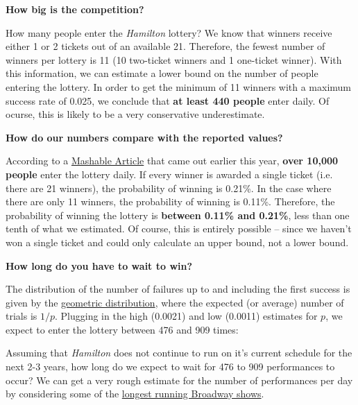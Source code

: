 \documentclass[12pt]{article}
\begin{document}
\vspace{5mm}

\textbf{How big is the competition?}

How many people enter the \textit{Hamilton} lottery? We know that winners receive either 1 or 2 tickets out of an available 21. Therefore, the fewest number of winners per lottery is 11 (10 two-ticket winners and 1 one-ticket winner). With this information, we can estimate a lower bound on the number of people entering the lottery. In order to get the minimum of 11 winners with a maximum success rate of 0.025, we conclude that \textbf{at least 440 people} enter daily.  Of ocurse, this is likely to be a very conservative underestimate.

\vspace{5mm}

\textbf{How do our numbers compare with the reported values?}

According to a \href{http://mashable.com/2016/05/26/odds-of-winning-a-hamilton-ticket/#v7nFUSKb6iqZ}{Mashable Article} that came out earlier this year, \textbf{over 10,000 people} enter the lottery daily. If every winner is awarded a single ticket (i.e. there are 21 winners), the probability of winning is 0.21\%. In the case where there are only 11 winners, the probability of winning is 0.11\%. Therefore, the probability of winning the lottery is \textbf{between 0.11\% and 0.21\%}, less than one tenth of what we estimated.  Of course, this is entirely possible -- since we haven't won a single ticket and could only calculate an upper bound, not a lower bound.

\vspace{5mm}

\textbf{How long do you have to wait to win?}

The distribution of the number of failures up to and including the first success is given by the \href{https://en.wikipedia.org/wiki/Geometric\_distribution}{geometric distribution}, where the expected (or average) number of trials is $1/p$. Plugging in the high (0.0021) and low (0.0011) estimates for $p$, we expect to enter the lottery between 476 and 909 times:

Assuming that \textit{Hamilton} does not continue to run on it's current schedule for the next 2-3 years, how long do we expect to wait for 476 to 909 performances to occur? We can get a very rough estimate for the number of performances per day by considering some of the \href{https://en.wikipedia.org/wiki/List\_of\_the\_longest-running\_Broadway\_shows}{longest running Broadway shows}.
\end{document}
